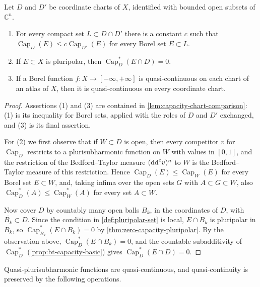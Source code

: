 \begin{lemma}\label{lem:chart-capacity-comparison}
Let $D$ and $D'$ be coordinate charts of $X$, identified with bounded open subsets of $\mathbb C^n$.
\begin{enumerate}
 \item For every compact set $L\subset D\cap D'$ there is a constant $c$ such that $\operatorname{Cap}_D(E)\leq c\operatorname{Cap}_{D'}(E)$ for every Borel set $E\subset L$.
 \item If $E\subset X$ is pluripolar, then $\operatorname{Cap}_D^*(E\cap D)=0$.
 \item If a Borel function $f\colon X\to[-\infty,+\infty]$ is quasi-continuous on each chart of an atlas of $X$, then it is quasi-continuous on every coordinate chart.
\end{enumerate}
\end{lemma}
\begin{proof}
Assertions (1) and (3) are contained in \cref{lem:capacity-chart-comparison}: (1) is its inequality for Borel sets, applied with the roles of $D$ and $D'$ exchanged, and (3) is its final assertion.

For (2) we first observe that if $W\subset D$ is open, then every competitor $v$ for $\operatorname{Cap}_D$ restricts to a plurisubharmonic function on $W$ with values in $[0,1]$, and the restriction of the Bedford--Taylor measure $(\mathrm{dd}^{\mathrm{c}} v)^n$ to $W$ is the Bedford--Taylor measure of this restriction. Hence $\operatorname{Cap}_D(E)\leq\operatorname{Cap}_W(E)$ for every Borel set $E\subset W$, and, taking infima over the open sets $G$ with $A\subset G\subset W$, also $\operatorname{Cap}_D^*(A)\leq\operatorname{Cap}_W^*(A)$ for every set $A\subset W$.

Now cover $D$ by countably many open balls $B_k$, in the coordinates of $D$, with $\overline{B_k}\subset D$. Since the condition in \cref{def:pluripolar-set} is local, $E\cap B_k$ is pluripolar in $B_k$, so $\operatorname{Cap}_{B_k}^*(E\cap B_k)=0$ by \cref{thm:zero-capacity-pluripolar}. By the observation above, $\operatorname{Cap}_D^*(E\cap B_k)=0$, and the countable subadditivity of $\operatorname{Cap}_D^*$ (\cref{prop:bt-capacity-basic}) gives $\operatorname{Cap}_D^*(E\cap D)=0$.
\end{proof}

Quasi-plurisubharmonic functions are quasi-continuous, and quasi-continuity is preserved by the following operations.

